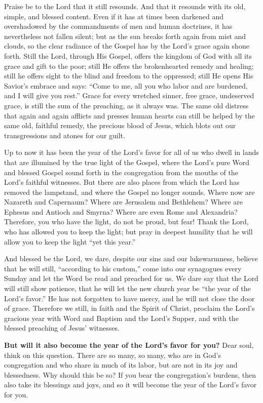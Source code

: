 Praise be to the Lord that it still resounds. And that it resounds with its old, simple, and blessed content. Even if it has at times been darkened and overshadowed by the commandments of men and human doctrines, it has nevertheless not fallen silent; but as the sun breaks forth again from mist and clouds, so the clear radiance of the Gospel has by the Lord’s grace again shone forth. Still the Lord, through His Gospel, offers the kingdom of God with all its grace and gift to the poor; still He offers the brokenhearted remedy and healing; still he offers sight to the blind and freedom to the oppressed; still He opens His Savior’s embrace and says: “Come to me, all you who labor and are burdened, and I will give you rest.” Grace for every wretched sinner, free grace, undeserved grace, is still the sum of the preaching, as it always was. The same old distress that again and again afflicts and presses human hearts can still be helped by the same old, faithful remedy, the precious blood of Jesus, which blots out our transgressions and atones for our guilt.

Up to now it has been the year of the Lord’s favor for all of us who dwell in lands that are illumined by the true light of the Gospel, where the Lord’s pure Word and blessed Gospel sound forth in the congregation from the mouths of the Lord’s faithful witnesses. But there are also places from which the Lord has removed the lampstand, and where the Gospel no longer sounds. Where now are Nazareth and Capernaum? Where are Jerusalem and Bethlehem? Where are Ephesus and Antioch and Smyrna? Where are even Rome and Alexandria? Therefore, you who have the light, do not be proud, but fear! Thank the Lord, who has allowed you to keep the light; but pray in deepest humility that he will allow you to keep the light “yet this year.”

And blessed be the Lord, we dare, despite our sins and our lukewarmness, believe that he will still, “according to his custom,” come into our synagogues every Sunday and let the Word be read and preached for us. We dare say that the Lord will still show patience, that he will let the new church year be “the year of the Lord’s favor.” He has not forgotten to have mercy, and he will not close the door of grace. Therefore we still, in faith and the Spirit of Christ, proclaim the Lord’s gracious year with Word and Baptism and the Lord’s Supper, and with the blessed preaching of Jesus’ witnesses. 

\textbf{But will it also become the year of the Lord’s favor for you?} Dear soul, think on this question. There are so many, so many, who are in God’s congregation and who share in much of its labor, but are not in its joy and blessedness. Why should this be so? If you bear the congregation’s burdens, then also take its blessings and joys, and so it will become the year of the Lord’s favor for you.

